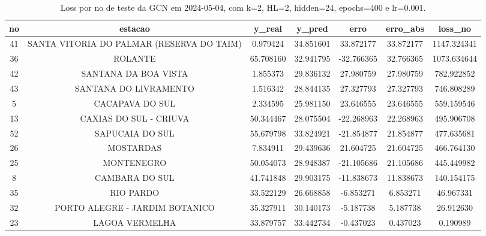 \begin{table}[h]
\centering
\caption{Loss por no de teste da GCN em 2024-05-04, com k=2, HL=2, hidden=24, epochs=400 e lr=0.001.}
\label{tab:gcn_loss_k2_hl2_h24_e400_d20240504}
\begin{tabular}{ccccccc}
\toprule
no & estacao & y\_real & y\_pred & erro & erro\_abs & loss\_no \\
\midrule
41 & SANTA VITORIA DO PALMAR (RESERVA DO TAIM) & 0.979424 & 34.851601 & 33.872177 & 33.872177 & 1147.324341 \\
36 & ROLANTE & 65.708160 & 32.941795 & -32.766365 & 32.766365 & 1073.634644 \\
42 & SANTANA DA BOA VISTA & 1.855373 & 29.836132 & 27.980759 & 27.980759 & 782.922852 \\
43 & SANTANA DO LIVRAMENTO & 1.516342 & 28.844135 & 27.327793 & 27.327793 & 746.808289 \\
5 & CACAPAVA DO SUL & 2.334595 & 25.981150 & 23.646555 & 23.646555 & 559.159546 \\
13 & CAXIAS DO SUL - CRIUVA & 50.344467 & 28.075504 & -22.268963 & 22.268963 & 495.906708 \\
52 & SAPUCAIA DO SUL & 55.679798 & 33.824921 & -21.854877 & 21.854877 & 477.635681 \\
26 & MOSTARDAS & 7.834911 & 29.439636 & 21.604725 & 21.604725 & 466.764130 \\
25 & MONTENEGRO & 50.054073 & 28.948387 & -21.105686 & 21.105686 & 445.449982 \\
8 & CAMBARA DO SUL & 41.741848 & 29.903175 & -11.838673 & 11.838673 & 140.154175 \\
35 & RIO PARDO & 33.522129 & 26.668858 & -6.853271 & 6.853271 & 46.967331 \\
32 & PORTO ALEGRE - JARDIM BOTANICO & 35.327911 & 30.140173 & -5.187738 & 5.187738 & 26.912630 \\
23 & LAGOA VERMELHA & 33.879757 & 33.442734 & -0.437023 & 0.437023 & 0.190989 \\
\bottomrule
\end{tabular}
\end{table}
